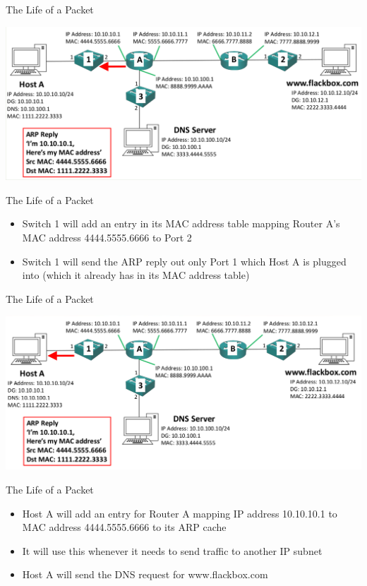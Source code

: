 \documentclass[pdflatex,compress,mathserif]{beamer}
\begin{document}
\begin{frame}{The Life of a Packet}
	\begin{center}
		\includegraphics[width=\linewidth]{img/img19}
	\end{center}
\end{frame}

\begin{frame}{The Life of a Packet}
	\begin{itemize}
		\item Switch 1 will add an entry in its MAC address table mapping Router A’s MAC address 4444.5555.6666 to Port 2
		\item Switch 1 will send the ARP reply out only Port 1 which Host A is plugged into (which it already has in its MAC address table)
	\end{itemize}
\end{frame}

\begin{frame}{The Life of a Packet}
	\begin{center}
		\includegraphics[width=\linewidth]{img/img20}
	\end{center}
\end{frame}

\begin{frame}{The Life of a Packet}
	\begin{itemize}
		\item Host A will add an entry for Router A mapping IP address 10.10.10.1 to MAC address 4444.5555.6666 to its ARP cache
		\item It will use this whenever it needs to send traffic to another IP subnet
		\item Host A will send the DNS request for www.flackbox.com
	\end{itemize}
\end{frame}
\end{document}
